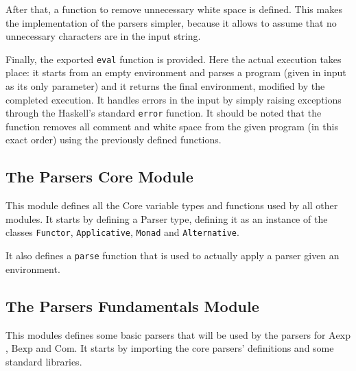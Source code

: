 \documentclass{esposito-documentation}
\begin{document}


After that, a function to remove unnecessary white space is defined. This makes
the implementation of the parsers simpler, because it allows to assume that no
unnecessary characters are in the input string.



Finally, the exported \lstinline|eval| function is provided. Here the actual
execution takes place: it starts from an empty environment and parses a program
(given in input as its only parameter) and it returns the final environment,
modified by the completed execution. It handles errors in the input by simply
raising exceptions through the Haskell's standard \lstinline|error| function.
It should be noted that the function removes all comment and white space from
the given program (in this exact order) using the previously defined functions.



\subsection{The Parsers Core Module}


This module defines all the Core variable types and functions used by all other
modules. It starts by defining a Parser type, defining it as an instance of the
classes \lstinline|Functor|, \lstinline|Applicative|, \lstinline|Monad| and
\lstinline|Alternative|.







It also defines a \lstinline|parse| function that is used to actually apply a
parser given an environment.


\subsection{The Parsers Fundamentals Module}


This modules defines some basic parsers that will be used by the parsers for
$\mathrm{Aexp}$, $\mathrm{Bexp}$ and $\mathrm{Com}$. It starts by importing the
core parsers' definitions and some standard libraries.
\end{document}
